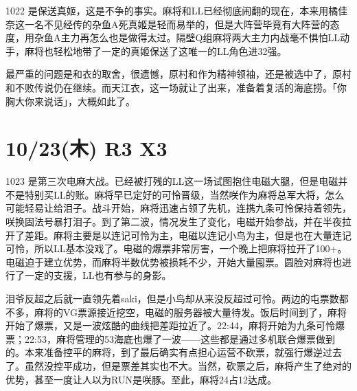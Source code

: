 1022 是保送真姬，这是不争的事实。麻将和LL已经彻底闹翻的现在，本来用橘佳奈这一名不见经传的杂鱼A死真姬是轻而易举的，但是大阵营毕竟有大阵营的态度，用杂鱼A主力再怎么也是做得太过。隔壁Q组麻将两大主力内战毫不惧怕LL动手，麻将也轻松地带了一定的真姬保送了这唯一的LL角色进32强。

最严重的问题是和衣的取舍，很遗憾，原村和作为精神领袖，还是被选中了，原村和不败传说仍在继续。而天江衣，这一场就让了出来，准备着复活的海底捞。「你胸大你来说话」，大概如此了。

\section{10/23(木) R3 X3}


1023 是第三次电麻大战。已经被打残的LL这一场试图抱住电磁大腿，但是电磁并不是特别买LL的账。麻将早已定好的可怜晋级，当然咲作为麻将总军大将，怎么可能轻易让给泪子。战斗开始，麻将迅速占领了先机，连携九条可怜保持着领先，咲换固法号暴打泪子。到了第二波，情况发生了变化，电磁开始参战，并在半夜拉开了差距。麻将主要是以连记可怜为主，电磁以连记小鸟为主，但是也在大量连记可怜，所以LL基本没戏了。电磁的爆票非常厉害，一个晚上把麻将拉开了100+。电磁迫于建立优势，而麻将半数优势被损耗不少，开始大量囤票。圆脸对麻将也进行了一定的支援，LL也有参与的身影。

泪爷反超之后就一直领先着saki，但是小鸟却从来没反超过可怜。两边的屯票数都不多，麻将的VG票源接近挖空，电磁的服务器被大量待发。饭后时间到了，麻将开始了爆票，又是一波炫酷的曲线把差距拉近了。22:44，麻将开始为九条可怜爆票；22:53，麻将管理的53海底也爆了一波——这些都是通过多机联合爆票做到的。本来准备控平的麻将，到了最后确实有点担心运营不砍票，就强行爆逆过去了。虽然没控平成功，但是票差其实也不大。当然，砍票之后，麻将产生了绝对的优势，甚至一度让人以为RUN是咲豚。至此，麻将24占12达成。

